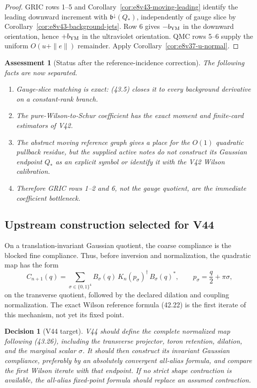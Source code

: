 \documentclass[11pt,oneside]{book}
\newtheorem{assessment}[theorem]{Assessment}
\newtheorem{decision}[theorem]{Decision}
\theoremstyle{definition}
\theoremstyle{remark}
\begin{document}
\begin{proof}
GRIC rows 1--5 and
Corollary~\ref{cor:e8v43-moving-leading} identify the leading
downward increment with
\(\mathfrak b^\downarrow(Q_*)\), independently of gauge slice by
Corollary~\ref{cor:e8v43-background-jets}.  Row 6 gives
\(-b_{\rm YM}\) in the downward orientation, hence \(+b_{\rm YM}\)
in the ultraviolet orientation.  QMC rows 5--6 supply the
uniform \(O(u+\|e\|)\) remainder.  Apply
Corollary~\ref{cor:e8v37-u-normal}.
\end{proof}

\begin{assessment}[Status after the reference-incidence correction]
\label{ass:e8v43-status}
The following facts are now separated.
\begin{enumerate}
\item Gauge-slice matching is exact: (43.5) closes it to every
      background derivative on a constant-rank branch.
\item The pure-Wilson-to-Schur coefficient has the exact moment and
      finite-card estimators of V42.
\item The abstract moving reference graph gives a place for the
      \(O(1)\) quadratic pullback residue, but the supplied active
      notes do not construct its Gaussian endpoint \(Q_*\) as an
      explicit symbol or identify it with the V42 Wilson calibration.
\item Therefore GRIC rows 1--2 and 6, not the gauge quotient, are the
      immediate coefficient bottleneck.
\end{enumerate}
\end{assessment}

\subsection{Upstream construction selected for V44}

On a translation-invariant Gaussian quotient, the coarse compliance
is the blocked fine compliance.  Thus, before inversion and
normalization, the quadratic map has the form
\[
 C_{n+1}(q)
 =\sum_{\sigma\in\{0,1\}^4}
 B_\sigma(q)\,
 K_n(p_\sigma)^\dagger\,
 B_\sigma(q)^*,\qquad
 p_\sigma=\frac q2+\pi\sigma,                                  \tag{43.26}
\]
on the transverse quotient, followed by the declared dilation and
coupling normalization.  The exact Wilson reference formula
(42.22) is the first iterate of this mechanism, not yet its fixed
point.

\begin{decision}[V44 target]
\label{dec:e8v43-next}
V44 should define the complete normalized map following (43.26),
including the transverse projector, toron retention, dilation, and
the marginal scalar \(\sigma\).  It should then construct its
invariant Gaussian compliance, preferably by an absolutely
convergent all-alias formula, and compare the first Wilson iterate
with that endpoint.  If no strict shape contraction is available,
the all-alias fixed-point formula should replace an assumed
contraction.
\end{decision}
\end{document}
